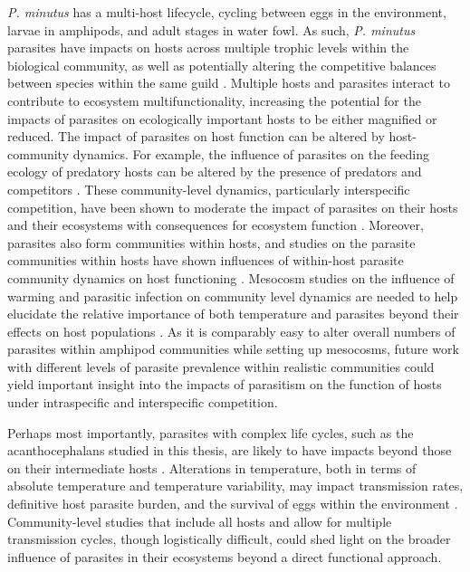 \textit{P. minutus} has a multi-host lifecycle, cycling between eggs in the environment, larvae in amphipods, and adult stages in water fowl. As such, \textit{P. minutus} parasites have impacts on hosts across multiple trophic levels within the biological community, as well as potentially altering the competitive balances between species within the same guild \citep{macneil2003}. Multiple hosts and parasites interact to contribute to ecosystem multifunctionality, increasing the potential for the impacts of parasites on ecologically important hosts to be either magnified or reduced. The impact of parasites on host function can be altered by host-community dynamics. For example, the influence of parasites on the feeding ecology of predatory hosts can be altered by the presence of predators \citep{reisinger2016} and competitors \citep{paterson2014}. These community-level dynamics, particularly interspecific competition, have been shown to moderate the impact of parasites on their hosts and their ecosystems with consequences for ecosystem function \citep{kordas2011}. Moreover, parasites also form communities within hosts, and studies on the parasite communities within hosts have shown influences of within-host parasite community dynamics on host functioning \citep{dezfuli2001, hafer2016, kirk2018}. Mesocosm studies on the influence of warming and parasitic infection on community level dynamics are needed to help elucidate the relative importance of both temperature and parasites beyond their effects on host populations \citep{woodward2010}. As it is comparably easy to alter overall numbers of parasites within amphipod communities while setting up mesocosms, future work with different levels of parasite prevalence within realistic communities could yield important insight into the impacts of parasitism on the function of hosts under intraspecific and interspecific competition. 

Perhaps most importantly, parasites with complex life cycles, such as the acanthocephalans studied in this thesis, are likely to have impacts beyond those on their intermediate hosts \citep{vancleave1951, moenickes2011}. Alterations in temperature, both in terms of absolute temperature and temperature variability, may impact transmission rates, definitive host parasite burden, and the survival of eggs within the environment \citep{lenihan1999, poulin2006, gehman2018}. Community-level studies that include all hosts and allow for multiple transmission cycles, though logistically difficult, could shed light on the broader influence of parasites in their ecosystems beyond a direct functional approach.

